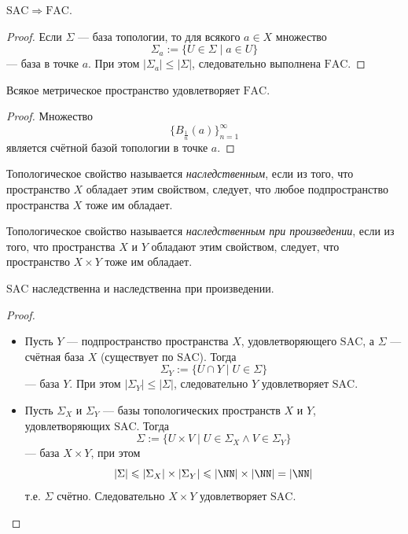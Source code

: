 \documentclass[12pt,a4paper]{article}
\newcommand{\FAC}{\ensuremath{\mathrm{FAC}}\xspace}
\newcommand{\SAC}{\ensuremath{\mathrm{SAC}}\xspace}
\begin{document}
    \begin{theorem}\label{AC_conseq_theorem}
        $\SAC \Rightarrow \FAC$.
    \end{theorem}

    \begin{proof}
        Если $\Sigma$ --- база топологии, то для всякого $a \in X$ множество
        \[\Sigma_a := \{U \in \Sigma \mid a \in U\}\]
        --- база в точке $a$. При этом $|\Sigma_a| \leqslant |\Sigma|$, следовательно выполнена $\FAC$.
    \end{proof}

    \begin{theorem}
        Всякое метрическое пространство удовлетворяет $\FAC$.
    \end{theorem}

    \begin{proof}
        Множество
        \[\{B_{\frac{1}{n}}(a)\}_{n=1}^\infty\]
        является счётной базой топологии в точке $a$.
    \end{proof}

    \begin{definition}
        Топологическое свойство называется \emph{наследственным}, если из того, что пространство $X$ обладает этим свойством, следует, что любое подпространство пространства $X$ тоже им обладает.

        Топологическое свойство называется \emph{наследственным при произведении}, если из того, что пространства $X$ и $Y$ обладают этим свойством, следует, что пространство $X \times Y$ тоже им обладает.
    \end{definition}

    \begin{theorem}
        $\SAC$ наследственна и наследственна при произведении.
    \end{theorem}

    \begin{proof}
        \begin{itemize}
            \item Пусть $Y$ --- подпространство пространства $X$, удовлетворяющего $\SAC$, а $\Sigma$ --- счётная база $X$ (существует по $\SAC$). Тогда
                \[\Sigma_Y := \{U \cap Y\mid U \in \Sigma\}\]
                --- база $Y$. При этом $|\Sigma_Y| \leqslant |\Sigma|$, следовательно $Y$ удовлетворяет $\SAC$.
            \item Пусть $\Sigma_X$ и $\Sigma_Y$ --- базы топологических пространств $X$ и $Y$, удовлетворяющих $\SAC$. Тогда
                \[\Sigma := \{U \times V \mid U \in \Sigma_X \wedge V \in \Sigma_Y\}\]
                --- база $X \times Y$, при этом
                \[|\Sigma| \leqslant |\Sigma_X| \times |\Sigma_Y| \leqslant |\NN| \times |\NN| = |\NN|\]
                т.е. $\Sigma$ счётно. Следовательно $X \times Y$ удовлетворяет $\SAC$.
        \end{itemize}
    \end{proof}
\end{document}

